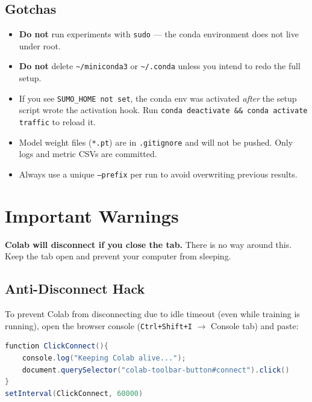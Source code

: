 \documentclass[11pt,a4paper]{article}
\begin{document}
\subsection{Gotchas}

\begin{itemize}
    \item \textbf{Do not} run experiments with \texttt{sudo} --- the conda environment does not live under root.
    \item \textbf{Do not} delete \texttt{\textasciitilde/miniconda3} or \texttt{\textasciitilde/.conda} unless you intend to redo the full setup.
    \item If you see \texttt{SUMO\_HOME not set}, the conda env was activated \emph{after} the setup script wrote the activation hook.  Run \texttt{conda deactivate \&\& conda activate traffic} to reload it.
    \item Model weight files (\texttt{*.pt}) are in \texttt{.gitignore} and will not be pushed.  Only logs and metric CSVs are committed.
    \item Always use a unique \texttt{--prefix} per run to avoid overwriting previous results.
\end{itemize}

\section{Important Warnings}

\begin{warningbox}
\textbf{Colab will disconnect if you close the tab.}
There is no way around this.  Keep the tab open and prevent your computer from sleeping.
\end{warningbox}

\subsection{Anti-Disconnect Hack}

To prevent Colab from disconnecting due to idle timeout (even while training is running), open the browser console (\texttt{Ctrl+Shift+I} $\to$ Console tab) and paste:

\begin{lstlisting}[language=Java]
function ClickConnect(){
    console.log("Keeping Colab alive...");
    document.querySelector("colab-toolbar-button#connect").click()
}
setInterval(ClickConnect, 60000)
\end{lstlisting}
\end{document}
